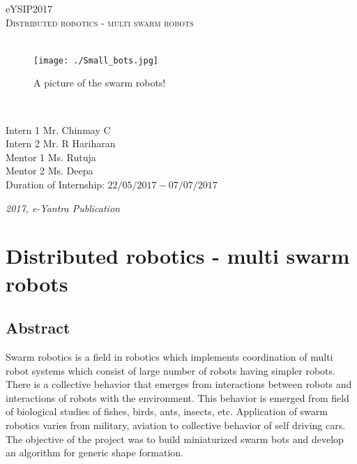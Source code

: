 \documentclass[a4paper,12pt,oneside]{book}
\begin{document}
\begin{titlepage}
\raggedright
{\Large eYSIP2017\\[1cm]}
{\Huge\scshape\centering Distributed robotics - multi swarm robots \\[.1in]}
\vfill
\hfill\\
\begin{figure}[h!]
	\centering\texttt{[image: ./Small\_bots.jpg]}		
	\caption{A picture of the swarm robots!}
\end{figure}	
\hfill\\
\begin{flushright}
{\large Intern 1 Mr. Chinmay C \\}
{\large Intern 2 Mr. R Hariharan \\}
{\large Mentor 1 Ms. Rutuja \\}
{\large Mentor 2 Ms. Deepa \\}
{\large Duration of Internship: $ 22/05/2017-07/07/2017 $ \\}
\end{flushright}

{\itshape 2017, e-Yantra Publication}
\end{titlepage}

\tableofcontents

\chapter[Distributed robotics - multi swarm robots]{Distributed robotics - multi swarm robots}
\section{Abstract}
Swarm robotics is a field in robotics which implements coordination of multi robot systems which consist of large number of robots having simpler robots. There is a collective behavior that emerges from interactions between robots and interactions of robots with the environment. This behavior is emerged from field of biological studies of fishes, birds, ants, insects, etc. Application of swarm robotics varies from military, aviation to collective behavior of self driving cars. The objective of the project was to build miniaturized swarm bots and develop an algorithm for generic shape formation.
\end{document}
